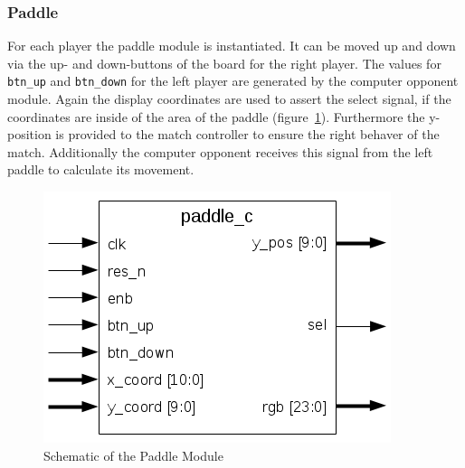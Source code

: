         \subsubsection{Paddle}
            For each player the paddle module is instantiated. It can be moved up and down via the up- and down-buttons of the board for the right player. The values for \texttt{btn\_up} and \texttt{btn\_down} for the left player are generated by the computer opponent module. Again the display coordinates are used to assert the select signal, if the coordinates are inside of the area of the paddle (figure~\ref{paddle_sch}). Furthermore the y-position is provided to the match controller to ensure the right behaver of the match. Additionally the computer opponent receives this signal from the left paddle to calculate its movement.
	        \begin{figure}[h]
		        \centering
		        \includegraphics[scale=0.7]{images/paddle_schematic.png}
		        \caption{Schematic of the Paddle Module}
		        \label{paddle_sch}
	        \end{figure}
